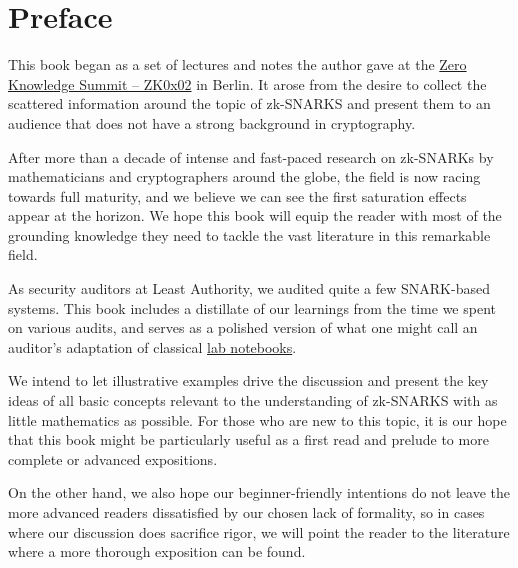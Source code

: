 \section*{Preface}

This book began as a set of lectures and notes the author gave at the \href{https://www.zksummit.com/}{Zero Knowledge Summit – ZK0x02} in Berlin. It arose from the desire to collect the scattered information around the topic of zk-SNARKS and present them to an audience that does not have a strong background in cryptography.

After more than a decade of intense and fast-paced research on zk-SNARKs by mathematicians
and cryptographers around the globe, the field is now racing towards full maturity, and we believe we can see the first saturation effects appear at the horizon. We hope this book will equip the reader with most
of the grounding knowledge they need to tackle the vast literature in this
remarkable field.

As security auditors at Least Authority, we audited quite a few SNARK-based systems. This book includes a distillate of our learnings from the time we spent on various audits, and serves as a polished version of what one might call an auditor's adaptation of classical \href{https://en.wikipedia.org/wiki/Lab_notebook}{lab notebooks}.  

We intend to let illustrative examples drive the discussion and present the key ideas of all basic concepts relevant to the understanding of zk-SNARKS with as little mathematics as possible. For those who are new to this topic, it is our hope that this book might be particularly useful as a first read and prelude to more complete or advanced expositions.

On the other hand, we also hope our beginner-friendly intentions do not leave
the more advanced readers dissatisfied by our chosen lack of formality, so in
cases where our discussion does sacrifice rigor, we will point the reader to the literature where a more thorough exposition can be found.


